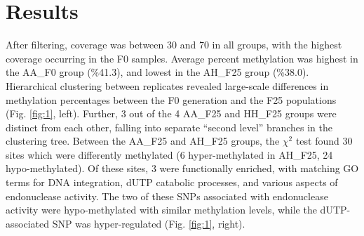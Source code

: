 \documentclass[11pt]{scrartcl}
\begin{document}
\section{Results}
\label{sec:results}

After filtering, coverage was between 30 and 70 in all groups, with
the highest coverage occurring in the F0 samples. Average percent
methylation was highest in the AA\_F0 group (\%41.3), and lowest in
the AH\_F25 group (\%38.0). Hierarchical clustering between replicates
revealed large-scale differences in methylation percentages between
the F0 generation and the F25 populations (Fig. \ref{fig:1},
left). Further, 3 out of the 4 AA\_F25 and HH\_F25 groups were
distinct from each other, falling into separate ``second level''
branches in the clustering tree. Between the AA\_F25 and AH\_F25
groups, the $\chi^2$ test found 30 sites which were differently
methylated (6 hyper-methylated in AH\_F25, 24 hypo-methylated). Of
these sites, 3 were functionally enriched, with matching GO terms for
DNA integration, dUTP catabolic processes, and various aspects of
endonuclease activity. The two of these SNPs associated with
endonuclease activity were hypo-methylated with similar methylation
levels, while the dUTP-associated SNP was hyper-regulated
(Fig. \ref{fig:1}, right).
\end{document}
